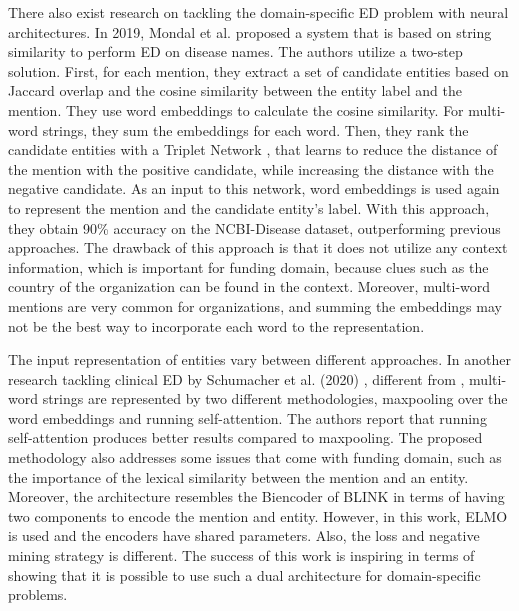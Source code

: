 \documentclass{report}
\theoremstyle{definition}
\theoremstyle{remark}
\begin{document}
There also exist research on tackling the domain-specific ED problem with neural architectures. In 2019, Mondal et al. \cite{MedicalTriplet} proposed a system that is based on string similarity to perform ED on disease names. The authors utilize a two-step solution. First, for each mention, they extract a set of candidate entities based on Jaccard overlap and the cosine similarity between the entity label and the mention. They use word embeddings to calculate the cosine similarity. For multi-word strings, they sum the embeddings for each word. Then, they rank the candidate entities with a Triplet Network \cite{tripletNetwork}, that learns to reduce the distance of the mention with the positive candidate, while increasing the distance with the negative candidate. As an input to this network, word embeddings is used again to represent the mention and the candidate entity's label. With this approach, they obtain 90\% accuracy on the NCBI-Disease dataset, outperforming previous approaches. The drawback of this approach is that it does not utilize any context information, which is important for funding domain, because clues such as the country of the organization can be found in the context. Moreover, multi-word mentions are very common for organizations, and summing the embeddings may not be the best way to incorporate each word to the representation.

The input representation of entities vary between different approaches. In another research tackling clinical ED by Schumacher et al. (2020) \cite{ClinicalConcept}, different from \cite{MedicalTriplet},  multi-word strings are represented by two different methodologies, maxpooling over the word embeddings and running self-attention. The authors report that running self-attention produces better results compared to maxpooling. The proposed methodology also addresses some issues that come with funding domain, such as the importance of the lexical similarity between the mention and an entity. Moreover, the architecture resembles the Biencoder of BLINK in terms of having two components to encode the mention and entity. However, in this work, ELMO \cite{elmo} is used and the encoders have shared parameters. Also, the loss and negative mining strategy is different. The success of this work is inspiring in terms of showing that it is possible to use such a dual architecture for domain-specific problems. 
\end{document}
